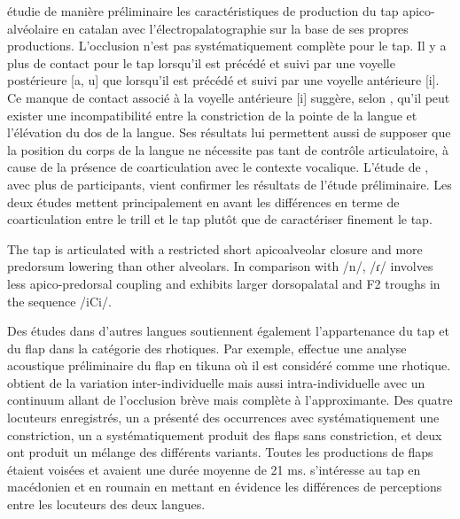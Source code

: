 \textcite{recasensProductionCharacteristicsApicoalveolar1991} étudie de manière préliminaire les caractéristiques de production du tap apico-alvéolaire en catalan avec l'électropalatographie sur la base de ses propres productions.
L'occlusion n'est pas systématiquement complète pour le tap. Il y a plus de contact pour le tap lorsqu'il est précédé et suivi par une voyelle postérieure [a, u] que lorsqu'il est précédé et suivi par une voyelle antérieure [i]. Ce manque de contact associé à la voyelle antérieure [i] suggère, selon \citeauthor{recasensProductionCharacteristicsApicoalveolar1991}, qu'il peut exister une incompatibilité entre la constriction de la pointe de la langue et l'élévation du dos de la langue. Ses résultats lui permettent aussi de supposer que la position du corps de la langue ne nécessite pas tant de contrôle articulatoire, à cause de la présence de coarticulation avec le contexte vocalique. L'étude de \textcite{recasensStudyLightDAC1999}, avec plus de participants, vient confirmer les résultats de l'étude préliminaire. Les deux études mettent principalement en avant les différences en terme de coarticulation entre le trill et le tap plutôt que de caractériser finement le tap.

\begin{displayquote}
	The tap is articulated with a restricted short apicoalveolar closure and more predorsum lowering than other alveolars. In comparison with /n/, /ɾ/ involves less apico-predorsal coupling and exhibits larger dorsopalatal and F2 troughs in the sequence /iCi/. \parencite[163]{recasensStudyLightDAC1999}
\end{displayquote}

Des études dans d'autres langues soutiennent également l'appartenance du tap et du flap dans la catégorie des rhotiques. Par exemple, \textcite[96]{carvalhoEstruturasFoneticasLingua2010} effectue une analyse acoustique préliminaire du flap en tikuna où il est considéré comme une rhotique. \citeauthor{carvalhoEstruturasFoneticasLingua2010} obtient de la variation inter-individuelle  mais aussi intra-individuelle avec un continuum allant de l'occlusion brève mais complète à l'approximante. Des quatre locuteurs enregistrés, un a présenté des occurrences avec systématiquement une constriction, un a systématiquement produit des flaps sans constriction, et deux ont produit un mélange des différents variants. Toutes les productions de flaps étaient voisées et avaient une durée moyenne de 21 ms. \textcite{savuMoreRhoticTap2014} s'intéresse au tap en macédonien et en roumain en mettant en évidence les différences de perceptions entre les locuteurs des deux langues.\\

